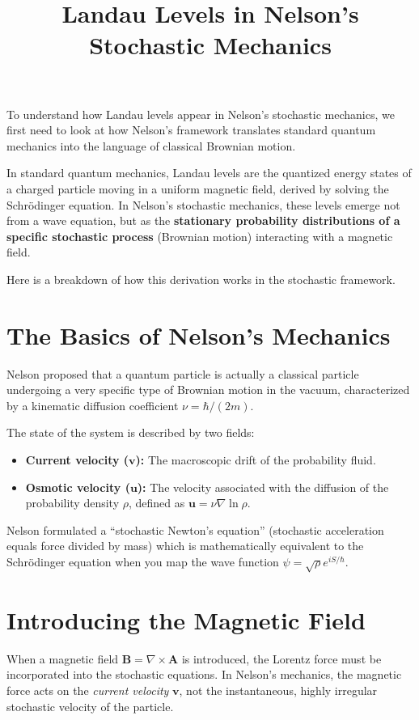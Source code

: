 \documentclass[12pt]{article}
\title{\textbf{Landau Levels in Nelson's Stochastic Mechanics}}
\author{}
\date{}
\begin{document}
\maketitle

To understand how Landau levels appear in Nelson's stochastic mechanics, we first need to look at how Nelson's framework translates standard quantum mechanics into the language of classical Brownian motion. 

In standard quantum mechanics, Landau levels are the quantized energy states of a charged particle moving in a uniform magnetic field, derived by solving the Schr\"odinger equation. In Nelson's stochastic mechanics, these levels emerge not from a wave equation, but as the \textbf{stationary probability distributions of a specific stochastic process} (Brownian motion) interacting with a magnetic field.

Here is a breakdown of how this derivation works in the stochastic framework.

\section{The Basics of Nelson's Mechanics}
Nelson proposed that a quantum particle is actually a classical particle undergoing a very specific type of Brownian motion in the vacuum, characterized by a kinematic diffusion coefficient $\nu = \hbar / (2m)$.

The state of the system is described by two fields:
\begin{itemize}
    \item \textbf{Current velocity ($\mathbf{v}$):} The macroscopic drift of the probability fluid.
    \item \textbf{Osmotic velocity ($\mathbf{u}$):} The velocity associated with the diffusion of the probability density $\rho$, defined as $\mathbf{u} = \nu \nabla \ln \rho$.
\end{itemize}

Nelson formulated a ``stochastic Newton's equation'' (stochastic acceleration equals force divided by mass) which is mathematically equivalent to the Schr\"odinger equation when you map the wave function $\psi = \sqrt{\rho} e^{iS/\hbar}$.

\section{Introducing the Magnetic Field}
When a magnetic field $\mathbf{B} = \nabla \times \mathbf{A}$ is introduced, the Lorentz force must be incorporated into the stochastic equations. In Nelson's mechanics, the magnetic force acts on the \emph{current velocity} $\mathbf{v}$, not the instantaneous, highly irregular stochastic velocity of the particle.
\end{document}
